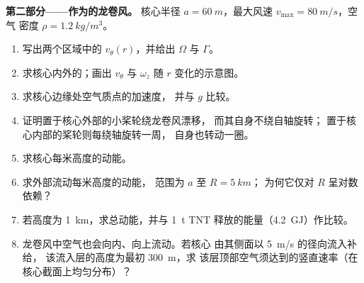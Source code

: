 \begin{problem}
\medskip
\noindent\textbf{第二部分——作为的龙卷风。}
核心半径 $a = \qty{60}{m}$，最大风速 $v_{\max} = \qty{80}{m/s}$，空气
密度 $\rho = \qty{1.2}{kg/m^3}$。
\begin{enumerate}[resume]
  \item 写出两个区域中的 $v_\theta(r)$，并给出 $\Omega$ 与 $\Gamma$。
  \item 求核心内外的；画出 $v_\theta$ 与 $\omega_z$
        随 $r$ 变化的示意图。
  \item 求核心边缘处空气质点的加速度，
        并与 $g$ 比较。
  \item 证明置于核心外部的小桨轮绕龙卷风漂移，
        而其自身不绕自轴旋转；
        置于核心内部的桨轮则每绕轴旋转一周，
        自身也转动一圈。
  \item 求核心每米高度的动能。
  \item 求外部流动每米高度的动能，
        范围为 $a$ 至 $R = \qty{5}{km}$；
        为何它仅对 $R$ 呈对数依赖？
  \item 若高度为 \qty{1}{km}，求总动能，并与
        \qty{1}{t} TNT 释放的能量（\qty{4.2}{GJ}）作比较。
  \item 龙卷风中空气也会向内、向上流动。若核心
        由其侧面以 \qty{5}{m/s} 的径向流入补给，
        该流入层的高度为最初 \qty{300}{m}，求
        该层顶部空气须达到的竖直速率（在
        核心截面上均匀分布）？
\end{enumerate}


\end{problem}
